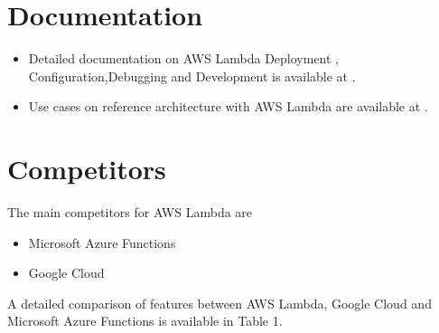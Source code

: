 \documentclass[9pt,twocolumn,twoside]{../../styles/osajnl}
\begin{document}
\section{Documentation}

\begin{itemize}
\renewcommand{\labelitemi}{\scriptsize$\bullet$} 
\item Detailed documentation on AWS Lambda  Deployment , 
Configuration,Debugging and Development is available at \cite{www-AWSLambdaDoc}.
\item Use cases on reference architecture with  AWS Lambda are available at 
\cite{www-AWSLambdaUseCase}. 
\end{itemize}

\section{Competitors}

The main competitors for AWS Lambda are
\begin{itemize}
\renewcommand{\labelitemi}{\scriptsize$\bullet$} 
\item Microsoft Azure Functions
\item Google Cloud
\end{itemize}

A detailed comparison of features between AWS Lambda, Google Cloud and 
Microsoft Azure Functions is available in Table 1.
\end{document}

